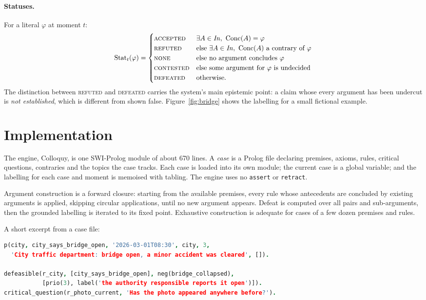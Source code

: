 \documentclass[11pt]{article}
\newcommand{\Conc}{\mathrm{Conc}}
\newcommand{\cmd}[1]{\texttt{#1}}
\begin{document}
\paragraph{Statuses.}
For a literal $\varphi$ at moment $t$:
\[
\mathrm{Stat}_t(\varphi) =
\begin{cases}
\textsc{accepted}  & \exists A\in\mathit{In},\ \Conc(A)=\varphi\\
\textsc{refuted}   & \text{else } \exists A\in\mathit{In},\ \Conc(A)\text{ a contrary of }\varphi\\
\textsc{none}      & \text{else no argument concludes }\varphi\\
\textsc{contested} & \text{else some argument for }\varphi\text{ is undecided}\\
\textsc{defeated}  & \text{otherwise.}
\end{cases}
\]
The distinction between \textsc{refuted} and \textsc{defeated} carries
the system's main epistemic point: a claim whose every argument has been
undercut is \emph{not established}, which is different from shown false.
Figure~\ref{fig:bridge} shows the labelling for a small fictional example.

\section{Implementation}
\label{sec:impl}

The engine, Colloquy, is one SWI-Prolog module of about 670 lines. A
\emph{case} is a Prolog file declaring premises, axioms, rules, critical
questions, contraries and the topics the case tracks. Each case is loaded
into its own module; the current case is a global variable; and the
labelling for each case and moment is memoised with tabling. The engine
uses no \cmd{assert} or \cmd{retract}.

Argument construction is a forward closure: starting from the available
premises, every rule whose antecedents are concluded by existing
arguments is applied, skipping circular applications, until no new
argument appears. Defeat is computed over all pairs and sub-arguments,
then the grounded labelling is iterated to its fixed point. Exhaustive
construction is adequate for cases of a few dozen premises and rules.

A short excerpt from a case file:
\begin{lstlisting}[language=Prolog]
p(city, city_says_bridge_open, '2026-03-01T08:30', city, 3,
  'City traffic department: bridge open, a minor accident was cleared', []).

defeasible(r_city, [city_says_bridge_open], neg(bridge_collapsed),
           [prio(3), label('the authority responsible reports it open')]).
critical_question(r_photo_current, 'Has the photo appeared anywhere before?').
\end{lstlisting}
\end{document}
